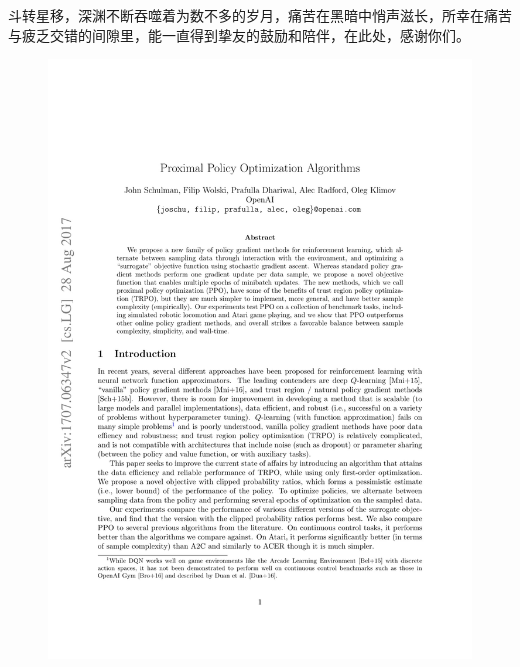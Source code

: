 \documentclass[bachelor]{thesis-uestc}
\begin{document}
	斗转星移，深渊不断吞噬着为数不多的岁月，痛苦在黑暗中悄声滋长，所幸在痛苦与疲乏交错的间隙里，能一直得到挚友的鼓励和陪伴，在此处，感谢你们。
	
	
	
	
	
	\thesistranslationoriginal

	\begin{figure}[h]
		\includegraphics[width=13cm]{./pic/ProximalPolicyOptimizationAlgorithms-01.jpg}
	\end{figure}
\end{document}
